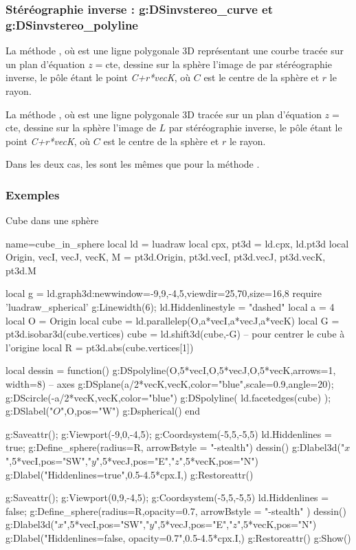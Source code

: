 \subsubsection{Stéréographie inverse : g:DSinvstereo\_curve et g:DSinvstereo\_polyline}

La méthode , où  est une ligne polygonale 3D représentant une courbe tracée sur un plan d'équation $z=$cte, dessine sur la sphère l'image de  par stéréographie inverse, le pôle étant le point \emph{C+r*vecK}, où $C$ est le centre de la sphère et $r$ le rayon.

La méthode , où  est une ligne polygonale 3D tracée sur un plan d'équation $z=$cte, dessine sur la sphère l'image de $L$ par stéréographie inverse, le pôle étant le point \emph{C+r*vecK}, où $C$ est le centre de la sphère et $r$ le rayon.

Dans les deux cas, les  sont les mêmes que pour la méthode .

\subsubsection{Exemples}

\begin{demo}{Cube dans une sphère}
\begin{luadraw}{name=cube_in_sphere}
local ld = luadraw
local cpx, pt3d = ld.cpx, ld.pt3d
local Origin, vecI, vecJ, vecK, M = pt3d.Origin, pt3d.vecI, pt3d.vecJ, pt3d.vecK, pt3d.M

local g = ld.graph3d:new{window={-9,9,-4,5},viewdir={25,70},size={16,8}}
require 'luadraw_spherical'
g:Linewidth(6); ld.Hiddenlinestyle = "dashed"
local a = 4
local O = Origin
local cube = ld.parallelep(O,a*vecI,a*vecJ,a*vecK)
local G = pt3d.isobar3d(cube.vertices)
cube = ld.shift3d(cube,-G) -- pour centrer le cube à l'origine
local R = pt3d.abs(cube.vertices[1])

local dessin = function()
    g:DSpolyline({{O,5*vecI},{O,5*vecJ},{O,5*vecK}},{arrows=1, width=8}) -- axes
    g:DSplane({a/2*vecK,vecK},{color="blue",scale=0.9,angle=20}); 
    g:DScircle({-a/2*vecK,vecK},{color="blue"})
    g:DSpolyline( ld.facetedges(cube) ); g:DSlabel("$O$",O,{pos="W"})
    g:Dspherical()
end

g:Saveattr(); g:Viewport(-9,0,-4,5); g:Coordsystem(-5,5,-5,5)
ld.Hiddenlines = true; g:Define_sphere({radius=R, arrowBstyle = "-stealth"})
dessin()
g:Dlabel3d("$x$",5*vecI,{pos="SW"},"$y$",5*vecJ,{pos="E"},"$z$",5*vecK,{pos="N"})
g:Dlabel("Hiddenlines=true",0.5-4.5*cpx.I,{})
g:Restoreattr()

g:Saveattr(); g:Viewport(0,9,-4,5); g:Coordsystem(-5,5,-5,5)
ld.Hiddenlines = false; g:Define_sphere({radius=R,opacity=0.7, arrowBstyle = "-stealth"} )
dessin()
g:Dlabel3d("$x$",5*vecI,{pos="SW"},"$y$",5*vecJ,{pos="E"},"$z$",5*vecK,{pos="N"})
g:Dlabel("Hiddenlines=false, opacity=0.7",0.5-4.5*cpx.I,{})
g:Restoreattr()
g:Show()
\end{luadraw}
\end{demo}

